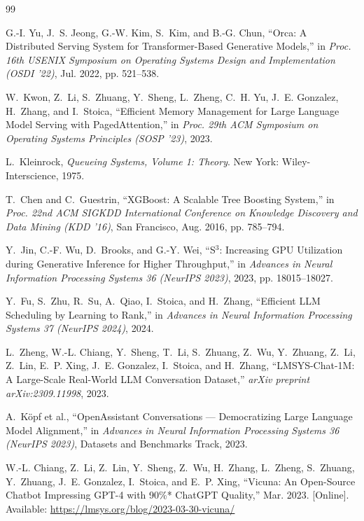 \documentclass[10pt,letterpaper]{article}
\begin{document}
\begin{thebibliography}{99}

G.-I. Yu, J.~S. Jeong, G.-W. Kim, S.~Kim, and B.-G. Chun,
``Orca: A Distributed Serving System for Transformer-Based Generative Models,''
in \textit{Proc. 16th USENIX Symposium on Operating Systems Design and Implementation (OSDI '22)},
Jul. 2022, pp. 521--538.

W.~Kwon, Z.~Li, S.~Zhuang, Y.~Sheng, L.~Zheng, C.~H. Yu, J.~E. Gonzalez, H.~Zhang, and I.~Stoica,
``Efficient Memory Management for Large Language Model Serving with PagedAttention,''
in \textit{Proc. 29th ACM Symposium on Operating Systems Principles (SOSP '23)},
2023.

L.~Kleinrock,
\textit{Queueing Systems, Volume 1: Theory}.
New York: Wiley-Interscience, 1975.

T.~Chen and C.~Guestrin,
``XGBoost: A Scalable Tree Boosting System,''
in \textit{Proc. 22nd ACM SIGKDD International Conference on Knowledge Discovery and Data Mining (KDD '16)},
San Francisco, Aug. 2016, pp. 785--794.

Y.~Jin, C.-F. Wu, D.~Brooks, and G.-Y. Wei,
``S$^3$: Increasing GPU Utilization during Generative Inference for Higher Throughput,''
in \textit{Advances in Neural Information Processing Systems 36 (NeurIPS 2023)},
2023, pp. 18015--18027.

Y.~Fu, S.~Zhu, R.~Su, A.~Qiao, I.~Stoica, and H.~Zhang,
``Efficient LLM Scheduling by Learning to Rank,''
in \textit{Advances in Neural Information Processing Systems 37 (NeurIPS 2024)},
2024.

L.~Zheng, W.-L. Chiang, Y.~Sheng, T.~Li, S.~Zhuang, Z.~Wu, Y.~Zhuang, Z.~Li, Z.~Lin, E.~P. Xing, J.~E. Gonzalez, I.~Stoica, and H.~Zhang,
``LMSYS-Chat-1M: A Large-Scale Real-World LLM Conversation Dataset,''
\textit{arXiv preprint arXiv:2309.11998}, 2023.

A.~K\"{o}pf et al.,
``OpenAssistant Conversations --- Democratizing Large Language Model Alignment,''
in \textit{Advances in Neural Information Processing Systems 36 (NeurIPS 2023)}, Datasets and Benchmarks Track,
2023.

W.-L. Chiang, Z.~Li, Z.~Lin, Y.~Sheng, Z.~Wu, H.~Zhang, L.~Zheng, S.~Zhuang, Y.~Zhuang, J.~E. Gonzalez, I.~Stoica, and E.~P. Xing,
``Vicuna: An Open-Source Chatbot Impressing GPT-4 with 90\%* ChatGPT Quality,''
Mar. 2023. [Online]. Available: \url{https://lmsys.org/blog/2023-03-30-vicuna/}


\end{thebibliography}
\end{document}
